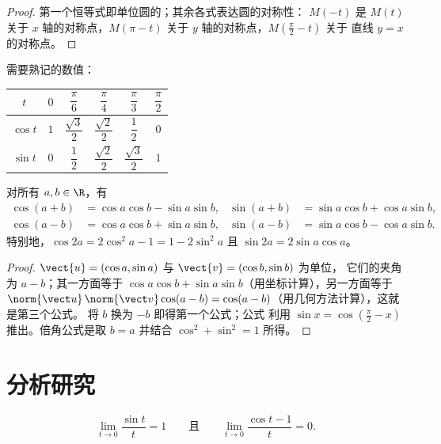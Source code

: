\begin{proof}
第一个恒等式即单位圆的；其余各式表达圆的对称性：
$M(-t)$ 是 $M(t)$ 关于
$x$ 轴的对称点，$M(\pi - t)$ 关于 $y$ 轴的对称点，$M(\frac\pi2 - t)$ 关于
直线 $y = x$ 的对称点。
\end{proof}

需要熟记的数值：
\begin{center}
\begin{tabular}{c|ccccc}
$t$ & $0$ & $\dfrac{\pi}{6}$ & $\dfrac{\pi}{4}$ & $\dfrac{\pi}{3}$ & $\dfrac{\pi}{2}$\\[6pt]
\hline\rule{0pt}{14pt}%
$\cos t$ & $1$ & $\dfrac{\sqrt3}{2}$ & $\dfrac{\sqrt2}{2}$ & $\dfrac12$ & $0$\\[6pt]
$\sin t$ & $0$ & $\dfrac12$ & $\dfrac{\sqrt2}{2}$ & $\dfrac{\sqrt3}{2}$ & $1$
\end{tabular}
\end{center}

\begin{proposition}[加法公式]\label{prop:g12:trigo:addition}
对所有 $a, b \in \R$，有
\begin{align*}
\cos(a+b) &= \cos a \cos b - \sin a \sin b, &
\sin(a+b) &= \sin a \cos b + \cos a \sin b,\\
\cos(a-b) &= \cos a \cos b + \sin a \sin b, &
\sin(a-b) &= \sin a \cos b - \cos a \sin b.
\end{align*}
特别地，$\cos 2a = 2\cos^2 a - 1 = 1 - 2\sin^2 a$ 且
$\sin 2a = 2 \sin a \cos a$。
\end{proposition}

\begin{proof}
 $\vect{u} = (\cos a, \sin a)$ 与 $\vect{v} = (\cos b, \sin b)$ 为单位，
它们的夹角为 $a - b$；其一方面等于
$\cos a\cos b + \sin a \sin b$（用坐标计算），另一方面等于
$\norm{\vect u}\,\norm{\vect v}\cos(a-b) = \cos(a - b)$（用几何方法计算），这就是第三个公式。
将 $b$ 换为 $-b$ 即得第一个公式；公式
利用 $\sin x = \cos(\frac\pi2 - x)$ 推出。倍角公式是取
$b = a$ 并结合 $\cos^2 + \sin^2 = 1$ 所得。
\end{proof}

\section{分析研究}

\begin{lemma}[基本极限]\label{lem:g12:trigo:sinxx}
\[
\lim_{t \to 0} \frac{\sin t}{t} = 1
\qquad\text{且}\qquad
\lim_{t \to 0} \frac{\cos t - 1}{t} = 0 .
\]
\end{lemma}


